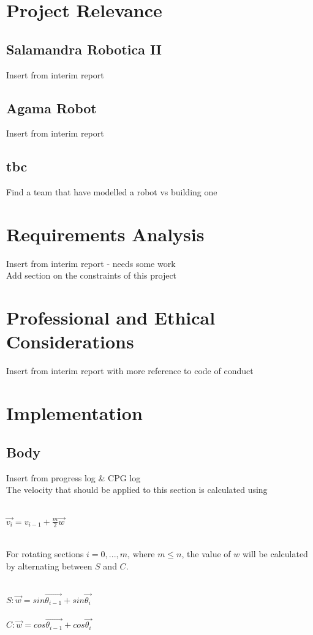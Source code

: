 \documentclass{article}
\begin{document}
\newpage
\section{Project Relevance}
\subsection{Salamandra Robotica II}
Insert from interim report
\subsection{Agama Robot}
Insert from interim report
\subsection{tbc}
Find a team that have modelled a robot vs building one

\newpage
\section{Requirements Analysis}
Insert from interim report - needs some work\\
Add section on the constraints of this project

\newpage
\section{Professional and Ethical Considerations}
Insert from interim report with more reference to code of conduct

\newpage
\section{Implementation}
\subsection{Body}
Insert from progress log \& CPG log\\
The velocity that should be applied to this section is calculated using\\\\
\begin{Large}
$\overrightarrow{v_{i}} = v_{i-1} + \frac{m}{2}\overrightarrow{w} $\\\\
\end{Large}
For rotating sections $i = 0, ..., m$, where $m \leq n$, the value of $w$ will be calculated by alternating between $S$ and $C$.\\\\
\begin{Large}
$S: \overrightarrow{w} = sin\overrightarrow{\theta_{i-1}} + sin\overrightarrow{\theta_{i}}$\\\\
$C: \overrightarrow{w} = cos\overrightarrow{\theta_{i-1}} + cos\overrightarrow{\theta_{i}}$\\\\
\end{Large}
\end{document}
